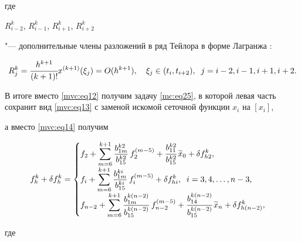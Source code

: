 где

$   R^{k}_{i-2}$, $R^k_{i-1}$, $R^k_{i+1}$, $R^k_{i+2}$

 "--- дополнительные члены разложений в ряд Тейлора в форме Лагранжа \cite{mc:bib14}:

$$

R^{k}_{j} =\cfrac{h^{k+1}}{(k+1)!} x^{(k+1)}(\xi_j) =O(h^{k+1}),

\quad \xi_j \in (t_{i},  t_{i+2}),\;\;  j = i-2, i-1, i+1, i+2 .

$$ 

В итоге вместо \eqref{mvc:eq12}  получим задачу \eqref{mc:eq25}, в которой левая часть сохранит вид \eqref{mvc:eq13} с заменой искомой сеточной функции $x_i$ на  $[x_i]$,

 а вместо \eqref{mvc:eq14} получим

 \begin{equation}

\label{mvc:eq29}

   f_{h}^k+   \delta f_{h}^k=

\begin{cases}

\displaystyle f_{2}+\sum_{m=6}^{k+1}\frac{b_{1m}^{k2}}{b_{15}^{k2}}\,f_2^{(m-5)}+\cfrac{b_{11}^{k2}}{b_{15}^{k2}}\,\widetilde{x}_0

+\delta f_{h2}^k,

\\[3mm]

\displaystyle f_{i}+\sum_{m=6}^{k+1}\frac{b_{1m}^{ki}}{b_{15}^{ki}}\,f_i^{(m-5)}+\delta f_{hi}^k,\;\; i=3,  4,  \dots,  n-3,

\\[3mm]

\displaystyle f_{n-2}+\sum_{m=6}^{k+1}\frac{b_{1m}^{k(n-2)}}{b_{15}^{k(n-2)}}\,f_{n-2}^{(m-5)}+\cfrac{b_{14}^{k(n-2)}}{b_{15}^{k(n-2)}}\,\widetilde{x}_n

+\delta f_{h(n-2)}^k,

\end{cases}

\end{equation}

где

